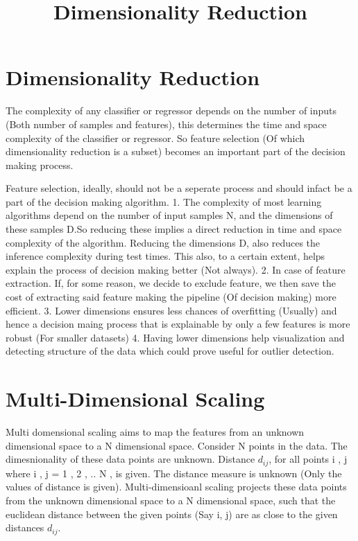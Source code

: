 \documentclass[11pt]{article}
\title{Dimensionality Reduction}
\begin{document}
    
    \maketitle
    
    

    
    \hypertarget{dimensionality-reduction}{%
\section{Dimensionality Reduction}\label{dimensionality-reduction}}

    The complexity of any classifier or regressor depends on the number of
inputs (Both number of samples and features), this determines the time
and space complexity of the classifier or regressor. So feature
selection (Of which dimensionality reduction is a subset) becomes an
important part of the decision making process.

    Feature selection, ideally, should not be a seperate process and should
infact be a part of the decision making algorithm. 1. The complexity of
most learning algorithms depend on the number of input samples N, and
the dimensions of these samples D.So reducing these implies a direct
reduction in time and space complexity of the algorithm. Reducing the
dimensions D, also reduces the inference complexity during test times.
This also, to a certain extent, helps explain the process of decision
making better (Not always). 2. In case of feature extraction. If, for
some reason, we decide to exclude feature, we then save the cost of
extracting said feature making the pipeline (Of decision making) more
efficient. 3. Lower dimensions ensures less chances of overfitting
(Usually) and hence a decision maing process that is explainable by only
a few features is more robust (For smaller datasets) 4. Having lower
dimensions help visualization and detecting structure of the data which
could prove useful for outlier detection.

    \hypertarget{multi-dimensional-scaling}{%
\section{Multi-Dimensional Scaling}\label{multi-dimensional-scaling}}

    Multi domensional scaling aims to map the features from an unknown
dimensional space to a N dimensional space. Consider N points in the
data. The dimesnionality of these data points are unknown. Distance
\(d_{ij}\), for all points i , j where i , j = 1 , 2 , .. N , is given.
The distance measure is unknown (Only the values of distance is given).
Multi-dimensioanl scaling projects these data points from the unknown
dimensional space to a N dimensional space, such that the euclidean
distance between the given points (Say i, j) are as close to the given
distances \(d_{ij}\).
\end{document}
